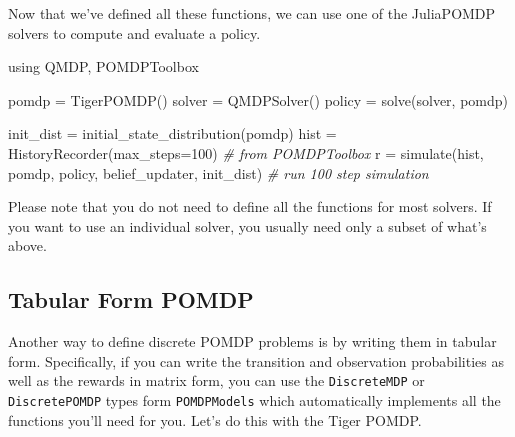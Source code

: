 \documentclass[12pt,]{article}
\newenvironment{Shaded}{}{}
\newcommand{\FloatTok}[1]{\textcolor[rgb]{0.25,0.63,0.44}{{#1}}}
\newcommand{\CommentTok}[1]{\textcolor[rgb]{0.38,0.63,0.69}{\textit{{#1}}}}
\newcommand{\NormalTok}[1]{{#1}}
\begin{document}
Now that we've defined all these functions, we can use one of the
JuliaPOMDP solvers to compute and evaluate a policy.

\begin{Shaded}
\begin{Highlighting}[]
\NormalTok{using QMDP, POMDPToolbox}

\NormalTok{pomdp = TigerPOMDP()}
\NormalTok{solver = QMDPSolver()}
\NormalTok{policy = solve(solver, pomdp)}

\NormalTok{init_dist = initial_state_distribution(pomdp)}
\NormalTok{hist = HistoryRecorder(max_steps=}\FloatTok{100}\NormalTok{) }\CommentTok{# from POMDPToolbox}
\NormalTok{r = simulate(hist, pomdp, policy, belief_updater, init_dist) }\CommentTok{# run 100 step simulation}
\end{Highlighting}
\end{Shaded}

Please note that you do not need to define all the functions for most
solvers. If you want to use an individual solver, you usually need only
a subset of what's above.

\subsection{Tabular Form POMDP}\label{tabular-form-pomdp}

Another way to define discrete POMDP problems is by writing them in
tabular form. Specifically, if you can write the transition and
observation probabilities as well as the rewards in matrix form, you can
use the \texttt{DiscreteMDP} or \texttt{DiscretePOMDP} types form
\texttt{POMDPModels} which automatically implements all the functions
you'll need for you. Let's do this with the Tiger POMDP.
\end{document}
